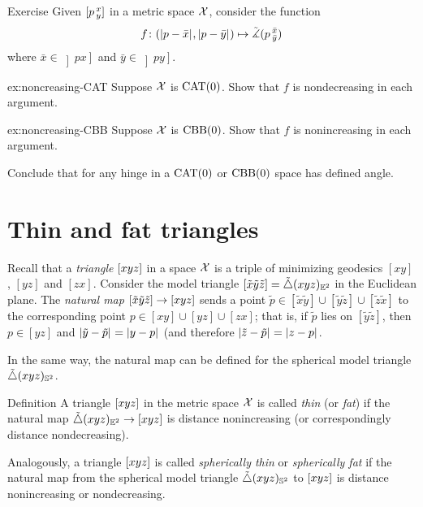 \begin{thm}{Exercise}\label{ex:noncreasing} Given $[p\,{}^{x}_{y}]$ in a metric space $\mathcal{X}$, consider the function 
\[f\:(\dist{p}{\bar x}{},\dist{p}{\bar y}{})\mapsto \angk p{\bar x}{\bar y}\]
where $\bar x\in\left]p x\right]$ and $\bar y\in\left]p y\right]$.

\begin{subthm}{ex:noncreasing-CAT}
Suppose $\mathcal{X}$ is $\mathrm{CAT}(0)$.
Show that $f$ is nondecreasing in each argument.
\end{subthm}

\begin{subthm}{ex:noncreasing-CBB}
Suppose $\mathcal{X}$ is $\mathrm{CBB}(0)$.
Show that $f$ is nonincreasing in each argument.
\end{subthm}

Conclude that for any hinge in a $\mathrm{CAT}(0)$ or $\mathrm{CBB}(0)$ space has defined angle.
\end{thm}

\section{Thin and fat triangles}

Recall that a \emph{triangle} $[xyz]$ in a space $\mathcal{X}$ 
is a triple of minimizing geodesics $[xy]$, $[yz]$ and $[zx]$.
Consider the  model triangle $[\tilde x\tilde y\tilde z]=\tilde\triangle{}({x}{y}{z})_{\mathbb{E}^2}$ in the Euclidean plane.
The \emph{natural map} $[\tilde x\tilde y\tilde z]\to [xyz]$ 
sends a point $\tilde p\in[\tilde x\tilde y]\cup[\tilde y\tilde z]\cup[\tilde z\tilde x]$ to the corresponding point $p\in[ x y]\cup[y z]\cup[ z x]$;
that is, if $\tilde p$ lies on $[\tilde y\tilde z]$,
then $p\in [y z]$ and $\dist{\tilde y}{\tilde p}{}=\dist{y}{p}{}$ (and therefore $\dist{\tilde z}{\tilde p}{}=\dist{z}{p}{}$.

In the same way, the natural map can be defined for the spherical model triangle $\tilde\triangle{}({x}{y}{z})_{\mathbb{S}^2}$.
 
\begin{thm}{Definition}\label{def:k-thin}
A triangle $[xyz]$ in the metric space $\mathcal{X}$ 
is called \emph{thin} (or \emph{fat}) if the natural map $\tilde\triangle{}({x}{y}{z})_{\mathbb{E}^2}\to [xyz]$ is distance nonincreasing (or correspondingly distance nondecreasing).

Analogously, a triangle $[xyz]$ 
is called \emph{spherically thin} or \emph{spherically fat} if
the natural map from the spherical model triangle $\tilde\triangle{}({x}{y}{z})_{\mathbb{S}^2}$ to $[xyz]$ is distance nonincreasing or nondecreasing.
\end{thm}


